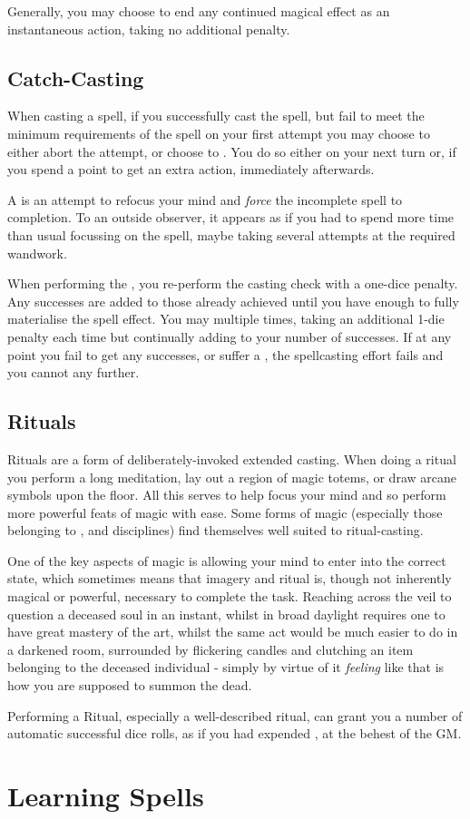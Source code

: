 Generally, you may choose to end any continued magical effect as an instantaneous action, taking no additional penalty. 

\subsection{Catch-Casting}

When casting a spell, if you successfully cast the spell, but fail to meet the minimum requirements of the spell on your first attempt you may choose to either abort the attempt, or choose to . You do so either on your next turn or, if you spend a  point to get an extra action, immediately afterwards. 

A  is an attempt to refocus your mind and {\it force} the incomplete spell to completion. To an outside observer, it appears as if you had to spend more time than usual focussing on the spell, maybe taking several attempts at the required wandwork. 

When performing the , you re-perform the casting check with a one-dice penalty. Any successes are added to those already achieved until you have enough to fully materialise the spell effect. You may  multiple times, taking an additional 1-die penalty each time but continually adding to your number of successes. If at any point you fail to get any successes, or suffer a , the spellcasting effort fails and you cannot  any further.

\subsection{Rituals}

Rituals are a form of deliberately-invoked extended casting. When doing a ritual you perform a long meditation, lay out a region of magic totems, or draw arcane symbols upon the floor. All this serves to help focus your mind and so perform more powerful feats of magic with ease. Some forms of magic (especially those belonging to ,  and  disciplines) find themselves well suited to ritual-casting. 

One of the key aspects of magic is allowing your mind to enter into the correct state, which sometimes means that imagery and ritual is, though not inherently magical or powerful, necessary to complete the task. Reaching across the veil to question a deceased soul in an instant, whilst in broad daylight requires one to have great mastery of the art, whilst the same act would be much easier to do in a darkened room, surrounded by flickering candles and clutching an item belonging to the deceased individual - simply by virtue of it {\it feeling} like that is how you are supposed to summon the dead. 

Performing a Ritual, especially a well-described ritual, can grant you a number of automatic successful dice rolls, as if you had expended , at the behest of the GM.  

\section{Learning Spells}

